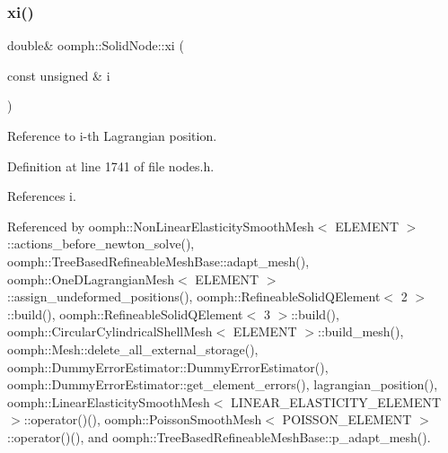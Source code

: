 \mbox{\label{classoomph_1_1SolidNode_aca98d62374067829ef896bdf62952385}} 
\subsubsection{\texorpdfstring{xi()}{xi()}\hspace{0.1cm}{\footnotesize\ttfamily [1/2]}}
{\footnotesize\ttfamily double\& oomph\+::\+Solid\+Node\+::xi (\begin{DoxyParamCaption}\item[{const unsigned \&}]{i }\end{DoxyParamCaption})\hspace{0.3cm}{\ttfamily [inline]}}



Reference to i-\/th Lagrangian position. 



Definition at line 1741 of file nodes.\+h.



References i.



Referenced by oomph\+::\+Non\+Linear\+Elasticity\+Smooth\+Mesh$<$ E\+L\+E\+M\+E\+N\+T $>$\+::actions\+\_\+before\+\_\+newton\+\_\+solve(), oomph\+::\+Tree\+Based\+Refineable\+Mesh\+Base\+::adapt\+\_\+mesh(), oomph\+::\+One\+D\+Lagrangian\+Mesh$<$ E\+L\+E\+M\+E\+N\+T $>$\+::assign\+\_\+undeformed\+\_\+positions(), oomph\+::\+Refineable\+Solid\+Q\+Element$<$ 2 $>$\+::build(), oomph\+::\+Refineable\+Solid\+Q\+Element$<$ 3 $>$\+::build(), oomph\+::\+Circular\+Cylindrical\+Shell\+Mesh$<$ E\+L\+E\+M\+E\+N\+T $>$\+::build\+\_\+mesh(), oomph\+::\+Mesh\+::delete\+\_\+all\+\_\+external\+\_\+storage(), oomph\+::\+Dummy\+Error\+Estimator\+::\+Dummy\+Error\+Estimator(), oomph\+::\+Dummy\+Error\+Estimator\+::get\+\_\+element\+\_\+errors(), lagrangian\+\_\+position(), oomph\+::\+Linear\+Elasticity\+Smooth\+Mesh$<$ L\+I\+N\+E\+A\+R\+\_\+\+E\+L\+A\+S\+T\+I\+C\+I\+T\+Y\+\_\+\+E\+L\+E\+M\+E\+N\+T $>$\+::operator()(), oomph\+::\+Poisson\+Smooth\+Mesh$<$ P\+O\+I\+S\+S\+O\+N\+\_\+\+E\+L\+E\+M\+E\+N\+T $>$\+::operator()(), and oomph\+::\+Tree\+Based\+Refineable\+Mesh\+Base\+::p\+\_\+adapt\+\_\+mesh().

\mbox{\label{classoomph_1_1SolidNode_a0f302ab875874e1474d86ce54ac49cb0}} 
